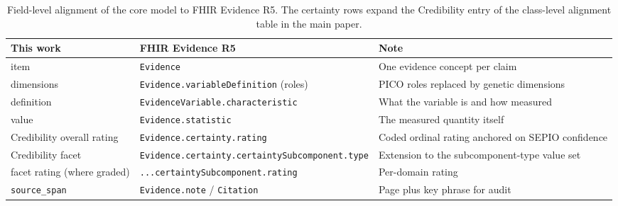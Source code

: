 \begin{table}[H]
    \centering
    \caption[FHIR field-level alignment]{Field-level alignment of the core model to FHIR Evidence R5. The certainty rows expand the Credibility entry of the class-level alignment table in the main paper.}
    \label{tab:fhir-fields}
    \small
    \begin{tabularx}{\linewidth}{@{}llX@{}}
\toprule
This work & FHIR Evidence R5 & Note \\
\midrule
\ScientificEvidence{} item        & \texttt{Evidence}                              & One evidence concept per claim \\
dimensions                         & \texttt{Evidence.variableDefinition} (roles)   & PICO roles replaced by genetic dimensions \\
\EvidenceVariable{} definition     & \texttt{EvidenceVariable.characteristic}       & What the variable is and how measured \\
\EvidenceVariable{} value          & \texttt{Evidence.statistic}                    & The measured quantity itself \\
Credibility overall rating         & \texttt{Evidence.certainty.rating}             & Coded ordinal rating anchored on SEPIO confidence \\
Credibility facet                  & \texttt{Evidence.certainty.\-certaintySubcomponent.type} & Extension to the subcomponent-type value set \\
facet rating (where graded)        & \texttt{...certaintySubcomponent.rating}       & Per-domain rating \\
\texttt{source\_span}              & \texttt{Evidence.note} / \texttt{Citation}     & Page plus key phrase for audit \\
\bottomrule
    \end{tabularx}
\end{table}
